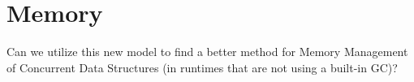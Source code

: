\section{Memory}

Can we utilize this new model to find a better method for Memory Management of Concurrent Data Structures (in runtimes that are not using a built-in GC)?